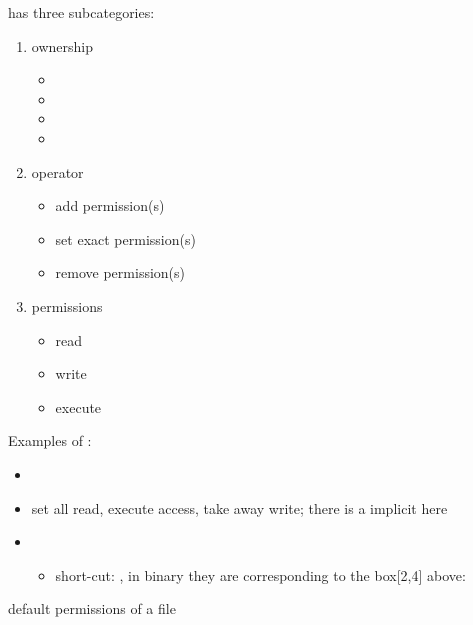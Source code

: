  has three subcategories:
\begin{enumerate}
    \item ownership
          \begin{itemize}
              \item {} \textrightarrow{} 
              \item {} \textrightarrow{} 
              \item {} \textrightarrow{} 
              \item {} \textrightarrow{} 
          \end{itemize}
    \item operator
          \begin{itemize}
              \item \code{+} \textrightarrow{} add permission(s)
              \item \code{=} \textrightarrow{} set exact permission(s)
              \item \code{-} \textrightarrow{} remove permission(s)
          \end{itemize}
    \item permissions
          \begin{itemize}
              \item {} \textrightarrow{} read
              \item {} \textrightarrow{} write
              \item {} \textrightarrow{} execute
          \end{itemize}
\end{enumerate}
Examples of :
\begin{itemize}
    \item {}
    \item {} \textrightarrow{} set all read, execute access,
          take away write; there is a implicit  here
    \item {}
          \begin{itemize}
              \item short-cut: , in binary they are corresponding
                    to the box[2,4] above: 
          \end{itemize}
\end{itemize}

 \textrightarrow{} default permissions of a file

